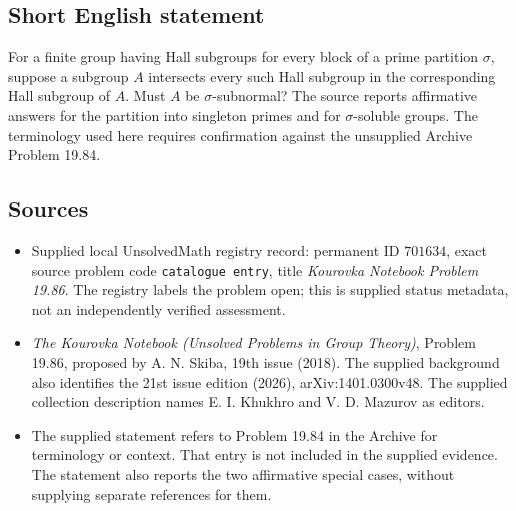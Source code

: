 \documentclass[11pt]{article}
\begin{document}
\subsection{Short English statement}
For a finite group having Hall subgroups for every block of a prime partition \(\sigma\), suppose a subgroup \(A\) intersects every such Hall subgroup in the corresponding Hall subgroup of \(A\). Must \(A\) be \(\sigma\)-subnormal? The source reports affirmative answers for the partition into singleton primes and for \(\sigma\)-soluble groups. The terminology used here requires confirmation against the unsupplied Archive Problem 19.84.
\subsection{Sources}
\begin{itemize}
\item Supplied local UnsolvedMath registry record: permanent ID \(701634\), exact source problem code \texttt{catalogue entry}, title \emph{Kourovka Notebook Problem 19.86}. The registry labels the problem open; this is supplied status metadata, not an independently verified assessment.
\item \emph{The Kourovka Notebook (Unsolved Problems in Group Theory)}, Problem 19.86, proposed by A. N. Skiba, 19th issue (2018). The supplied background also identifies the 21st issue edition (2026), arXiv:1401.0300v48. The supplied collection description names E. I. Khukhro and V. D. Mazurov as editors.
\item The supplied statement refers to Problem 19.84 in the Archive for terminology or context. That entry is not included in the supplied evidence. The statement also reports the two affirmative special cases, without supplying separate references for them.
\end{itemize}
\end{document}
